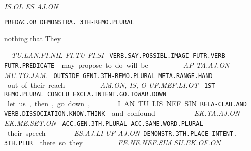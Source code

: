 {\is\ol~\es~\aj\on

{\it IS.OL		ES		AJ.ON	 }

{\tt PREDAC.OR	DEMONSTRA.	3TH-REMO.PLURAL }

nothing 	that		They 	 

\drie 

 
\tu\lan\Atlanpi\Atlannil~\Atlanfi\tu~\Atlanfi\si

{\it TU.LAN.PI.NIL		               FI.TU		FI.SI }

{\tt VERB.SAY.POSSIBL.IMAGI	FUTR.VERB	FUTR.PREDICATE }

may propose			to do		will be 
\drie 

  

\ap~\ta\aj\on~\Atlanmu\Atlanto\jam\period

{\it AP		TA.AJ.ON			MU.TO.JAM. }

{\tt OUTSIDE	GENI.3TH-REMO.PLURAL	META.RANGE.HAND }

out 		of their 				reach.
\drie

  
\am\on~\is~\Atlano\uf\mef\li\ot

{\it AM.ON,     IS,   O-UF.MEF.LI.OT				 }

{\tt 1ST-REMO.PLURAL CONCLU EXCLA.INTENT.GO.TOWAR.DOWN             }

let us, then, go down, 			      	 

\drie
 

\Atlani\an~\tu\lis\nef\Atlansin

I.AN			TU.LIS.NEF.SIN      

{\tt RELA-CLAU.AND	VERB.DISSOCIATION.KNOW.THINK }

and  			confound 

\drie

\ek\ta\aj\on~\ek\me\set\on

{\it EK.TA.AJ.ON		EK.ME.SET.ON }

{\tt ACC.GEN.3TH.PLURAL             ACC.SAME.WORD.PLURAL	 	}

their 			speech

\drie

  

\es\aj\lu~\uf~\aj\on

{\it ES.AJ.LI				UF		AJ.ON}				 
{\tt DEMONSTR.3TH.PLACE        INTENT.		3TH.PLUR	 }


there			so 			they 		

\drie

\fe\Atlanne\nef\Atlansim~\su\ek\of\on

{\it FE.NE.NEF.SIM			SU.EK.OF.ON	 }

}

